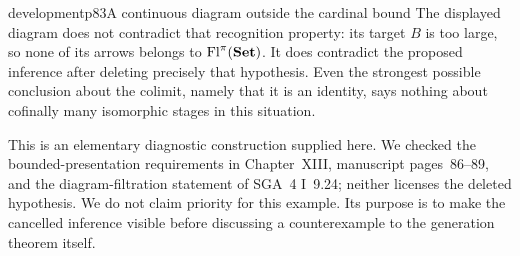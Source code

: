 \begin{dcomment}{development}{p83}{A continuous diagram outside the cardinal bound}
The displayed diagram does not contradict that recognition property: its target $B$ is too large, so none of its arrows belongs to $\mathrm{Fl}^\pi(\mathbf{Set})$. It does contradict the proposed inference after deleting precisely that hypothesis. Even the strongest possible conclusion about the colimit, namely that it is an identity, says nothing about cofinally many isomorphic stages in this situation.

This is an elementary diagnostic construction supplied here. We checked the bounded-presentation requirements in Chapter~XIII, manuscript pages~86--89, and the diagram-filtration statement of SGA~4 I~9.24; neither licenses the deleted hypothesis. We do not claim priority for this example. Its purpose is to make the cancelled inference visible before discussing a counterexample to the generation theorem itself.
\end{dcomment}


